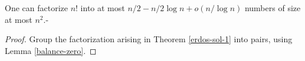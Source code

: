 \begin{theorem}
\label{erdos-sol-2}
\leanok
One can factorize $n!$ into at most $n/2 - n / 2\log n + o(n / \log n)$
  numbers of size at most $n^2$.-
\end{theorem}
\begin{proof}
\leanok
Group the factorization arising in Theorem \ref{erdos-sol-1} into pairs, using
  Lemma \ref{balance-zero}.
\end{proof}
